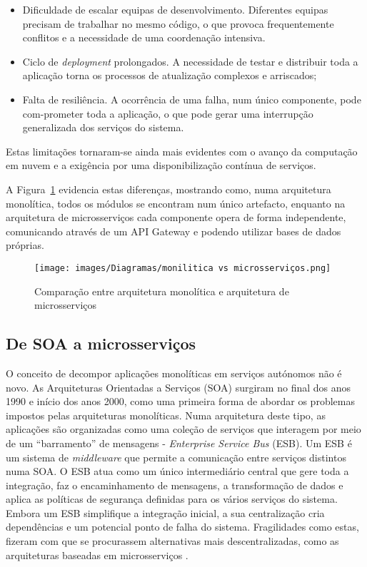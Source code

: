 \begin{itemize}
    \item Dificuldade de escalar equipas de desenvolvimento. Diferentes equipas precisam de trabalhar no mesmo código, o que provoca frequentemente conflitos e a necessidade de uma coordenação intensiva.
    \item Ciclo de \textit{deployment} prolongados. A necessidade de testar e distribuir toda a aplicação torna os processos de atualização complexos e arriscados;
    \item Falta de resiliência. A ocorrência de uma falha, num único componente, pode com-prometer toda a aplicação, o que pode gerar uma interrupção generalizada dos serviços do sistema.
\end{itemize}

Estas limitações tornaram-se ainda mais evidentes com o avanço da computação em nuvem e a exigência por uma disponibilização contínua de serviços.

A Figura~\ref{fig:monolitica_microservicos} evidencia estas diferenças, mostrando como, numa arquitetura monolítica, todos os módulos se encontram num único artefacto, enquanto na arquitetura de microsserviços cada componente opera de forma independente, comunicando através de um API Gateway e podendo utilizar bases de dados próprias.


\begin{figure}[h]
    \centering
    \texttt{[image: images/Diagramas/monilitica vs microsserviços.png]}
    \caption{Comparação entre arquitetura monolítica e arquitetura de microsserviços}
    \label{fig:monolitica_microservicos}
\end{figure}

\subsection{De SOA a microsserviços}


O conceito de decompor aplicações monolíticas em serviços autónomos não é novo. As Arquiteturas Orientadas a Serviços (SOA) surgiram no final dos anos 1990 e início dos anos 2000, como uma primeira forma de abordar os problemas impostos pelas arquiteturas monolíticas. Numa arquitetura deste tipo, as aplicações são organizadas como uma coleção de serviços que interagem por meio de um “barramento” de mensagens - \textit{Enterprise Service Bus} (ESB). Um ESB é um sistema de \textit{middleware} que permite a comunicação entre serviços distintos numa SOA. O ESB atua como um único intermediário central que gere toda a integração, faz o encaminhamento de mensagens, a transformação de dados e aplica as políticas de segurança definidas para os vários serviços do sistema. Embora um ESB simplifique a integração inicial, a sua centralização cria dependências e um potencial ponto de falha do sistema. Fragilidades como estas, fizeram com que se procurassem alternativas mais descentralizadas, como as arquiteturas baseadas em microsserviços \cite{Aziz2020}.

